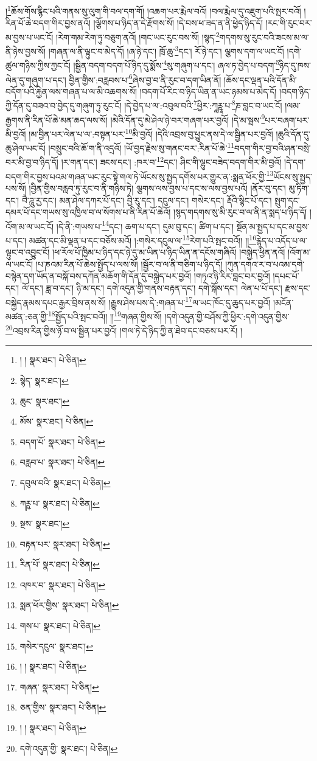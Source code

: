 །\footnote{། །  སྣར་ཐང་།  པེ་ཅིན། }ཆོས་གོས་རྙིང་པའི་གནས་སུ་ལུག་གི་བལ་དག་གོ། །འཆག་པར་རྨེལ་བའོ། །བལ་རྨེལ་དུ་འཇུག་པའི་སྤར་བའོ། །རིན་པོ་ཆེ་བདག་གིར་བྱས་ནའོ། །ལྕོགས་པ་ཉིད་ན་དེ་རྫོགས་སོ། །དེ་བས་ཕ་ཟད་ན་ནི་ཕྱེད་ཉིད་དོ། །རང་གི་རུང་བར་མ་བྱས་པ་ཡང་ངོ། །རེག་གམ་རེག་ཏུ་བཅུག་ནའོ། །གང་ཡང་རུང་བས་སོ། །སྙད་\footnote{སྙེད་  སྣར་ཐང་། }གདགས་སུ་རུང་བའི་ཟངས་མ་ལ་ནི་ཉེས་བྱས་སོ། །གཞན་ལ་ནི་ལྟུང་བ་མེད་དོ། །ཞ་ཉེ་དང་། ཁྲོ་ཆུ་\footnote{ཆུང་  སྣར་ཐང་། }དང་། རོ་ཉེ་དང་། ལྕགས་དག་ལ་ཡང་ངོ། །དགེ་ཚུལ་གཉིས་ཀྱིས་ཀྱང་ངོ། །སྦྱིན་བདག་བདག་པོ་ཉིད་དུ་སྨོས་\footnote{མོས་  སྣར་ཐང་།  པེ་ཅིན། }སུ་གཞུག་པ་དང་། ཞལ་ཏ་བྱེད་པ་བདག་\footnote{བདག་པོ་  སྣར་ཐང་།  པེ་ཅིན། }ཉིད་དུ་ཁས་ལེན་དུ་གཞུག་པ་དང་། བྱིན་གྱིས་:བརླབས་པ་\footnote{བརླབ་པ་  སྣར་ཐང་།  པེ་ཅིན། }ཞེས་བྱ་བ་ནི་རུང་བ་དག་ཡིན་ནོ། །ཆོས་དང་ལྡན་པའི་དོན་མི་བདོག་པའི་རྐྱེན་ལས་གཞན་པ་ལ་མི་འཆགས་སོ། །བདག་པོ་རིང་བ་ཉིད་ཡིན་ན་ཡང་ཉམས་པ་མེད་དོ། །བདག་ཉིད་ཀྱི་དོན་དུ་བཟའ་བ་བྱེད་དུ་གཞུག་ཏུ་རུང་ངོ། །དེ་བྱེད་པ་ལ་:འབུལ་བའི་\footnote{དབུལ་བའི་  སྣར་ཐང་།  པེ་ཅིན། }ཕྱིར་:ཀཱཪྵཱ་པ་\footnote{ཀཪྵ་པ་  སྣར་ཐང་།  པེ་ཅིན། }ཎ་བླང་བ་ཡང་ངོ། །ལམ་རྒྱགས་ནི་རིན་པོ་ཆེ་མན་ཆད་ལས་སོ། །མེའི་དོན་དུ་མེ་ཤེལ་ཉེ་བར་གཞག་པར་བྱའོ། །དེ་མ་སྦས་\footnote{སྔས་  སྣར་ཐང་། }པར་བཞག་པར་མི་བྱའོ། །མ་བྱིན་པར་ལེན་པ་ལ་:བསྟན་པར་\footnote{བརྟན་པར་  སྣར་ཐང་།  པེ་ཅིན། }མི་བྱའོ། །དེའི་འབྲས་བུ་ཕྱུང་ནས་དེ་ལ་སྦྱིན་པར་བྱའོ། །ཆུའི་དོན་དུ་ཆུ་ཤེལ་ཡང་ངོ། །བསྲུང་བའི་ཆོ་ག་ནི་འདྲའོ། །ཡོ་བྱད་རྗེས་སུ་གནང་བར་:རིན་པོ་ཆེ་\footnote{རིན་པོ་  སྣར་ཐང་།  པེ་ཅིན། }བདག་གིར་བྱ་བའི་ཤན་བསྲེ་བར་མི་བྱ་བ་ཉིད་དོ། །ར་གན་དང་། ཟངས་དང་། :ཁར་བ་\footnote{འཁར་བ་  སྣར་ཐང་།  པེ་ཅིན། }དང་། ཤིང་གི་ལྷུང་བཟེད་བདག་གིར་མི་བྱའོ། །དེ་དག་བདག་གིར་བྱས་པའམ་གཞན་ཡང་རུང་སྟེ་གལ་ཏེ་ཡོངས་སུ་སྤྱད་དགོས་པར་གྱུར་ན་:སྨན་ཕོར་གྱི་\footnote{སྨན་ཕོར་གྱིས་  སྣར་ཐང་།  པེ་ཅིན། }ཡོངས་སུ་སྤྱད་པས་སོ། །བྱིན་གྱིས་བརླབ་ཏུ་རུང་བ་ནི་གཉིས་ཏེ། ལྕགས་ལས་བྱས་པ་དང་ས་ལས་བྱས་པའོ། །ནོར་བུ་དང་། མུ་ཏིག་དང་། བཻ་ཌཱུ་རྱ་དང་། མན་ཤེལ་དཀར་པོ་དང་། བྱི་རུ་དང་། དངུལ་དང་། གསེར་དང་། རྡོའི་སྙིང་པོ་དང་། སྤུག་དང་དམར་པོ་དང་གཡས་སུ་འཁྱིལ་བ་ལ་སོགས་པ་ནི་རིན་པོ་ཆེའོ། །སྙད་གདགས་སུ་མི་རུང་བ་ལ་ནི་ན་སྨད་པ་ཉིད་དོ། །འོག་མ་ལ་ཡང་ངོ། །དེ་ནི་:གཡས་པ་\footnote{གས་པ་  སྣར་ཐང་།  པེ་ཅིན། }དང་། ཆག་པ་དང་། དུམ་བུ་དང་། ཚིག་པ་དང་། སྔོན་མ་སྤྱད་པ་དང་མ་བྱས་པ་དང་། མཚན་དང་མི་ལྡན་པ་དང་བཅོས་མའོ། །:གསེར་དངུལ་ལ་\footnote{གསེར་དངུལ་  སྣར་ཐང་། }རེག་པའི་སྤང་བའོ།། །།\footnote{། །  སྣར་ཐང་།  པེ་ཅིན། }རྙེད་པ་འདོད་པ་ལ་ལྟུང་བ་འབྱུང་ངོ། །ཕ་རོལ་པོ་ཁྱིམ་པ་ཉིད་དང་ཉེ་དུ་མ་ཡིན་པ་ཉིད་ཡིན་ན་དངོས་གཞིའོ། །བསྐྱེད་ཕྱིན་ནའོ། །འོག་མ་ལ་ཡང་ངོ། །པ་ཎའམ་རིན་པོ་ཆེས་སྤྱོད་པ་ལས་སོ། །སྦྱོར་བ་ལ་ནི་གཅིག་པ་ཉིད་དོ། །ཀུན་དགའ་ར་བ་པའམ་དགེ་བསྙེན་དག་ཡོད་ན་བསྐོ་བས་དཀོན་མཆོག་གི་དོན་དུ་བསྐྱེད་པར་བྱའོ། །གཏའ་ཉི་རིར་བླང་བར་བྱའོ། །དཔང་པོ་དང་། ལོ་དང་། ཟླ་བ་དང་། ཉི་མ་དང་། དགེ་འདུན་གྱི་གནས་བརྟན་དང་། དགེ་སྐོས་དང་། ལེན་པ་པོ་དང་། རྫས་དང་བསྐྱེད་རྣམས་དཔང་རྒྱར་བྲིས་ནས་སོ། །རྒྱུས་ཤེས་པས་དེ་:གཞན་པ་\footnote{གཞན་  སྣར་ཐང་།  པེ་ཅིན། }ལ་ཡང་ཁོང་དུ་ཆུད་པར་བྱའོ། །མངོན་མཚན་:ཅན་གྱི་\footnote{ཅན་གྱིས་  སྣར་ཐང་།  པེ་ཅིན། }སྤྱོད་པའི་སྤང་བའོ།། །།\footnote{། །  སྣར་ཐང་།  པེ་ཅིན། }གཞན་གྱིས་སོ། །དགེ་འདུན་གྱི་བཤོས་ཀྱི་ཕྱིར་:དགེ་འདུན་གྱིས་\footnote{དགེ་འདུན་གྱི་  སྣར་ཐང་།  པེ་ཅིན། }འབྲས་རིན་གྱིས་ཉོ་བ་ལ་སྦྱིན་པར་བྱའོ། །གལ་ཏེ་དེ་ཉིད་ཀྱི་ན་ཐེབ་དང་བཅས་པར་རོ། །
